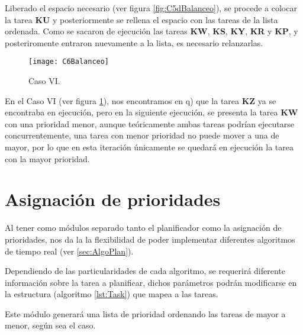    Liberado el espacio necesario (ver figura  \ref{fig:C5dBalanceo}), se procede a colocar la tarea \textbf{KU} y posteriormente se rellena el espacio con las tareas de la lista ordenada. Como se sacaron de ejecución las tareas \textbf{KW}, \textbf{KS}, \textbf{KY}, \textbf{KR} y \textbf{KP}, y posteriromente entraron nuevamente a la lista, es necesario relanzarlas.
\newline

    
    \begin{figure}[ht]
      \centering
        \texttt{[image: C6Balanceo]}
        \caption{Caso VI.}
        \label{fig:C6Balanceo}
    \end{figure}
    
    En el Caso VI (ver figura  \ref{fig:C6Balanceo}), nos encontramos en q) que la tarea \textbf{KZ} ya se encontraba en ejecución, pero en la siguiente ejecución, se presenta la tarea \textbf{KW} con una prioridad menor, aunque teóricamente ambas tareas podrían ejecutarse concurrentemente, una tarea con menor prioridad no puede mover a una de mayor, por lo que en esta iteración únicamente se quedará en ejecución la tarea con la mayor prioridad.
\newline

    	
\section{Asignación de prioridades} \label{secc:asigPrioridad}

Al tener como módulos separado tanto el planificador como la asignación de prioridades, nos da la la flexibilidad de poder implementar diferentes algoritmos de tiempo real (ver \ref{sec:AlgoPlan}).

Dependiendo de las particularidades de cada algoritmo, se requerirá diferente información sobre la tarea a planificar, dichos parámetros podrán modificarse en la estructura (algoritmo \ref{lst:Task}) que mapea a las tareas.

%

Este módulo generará una lista de prioridad ordenando las tareas de mayor a menor, según sea el caso.



